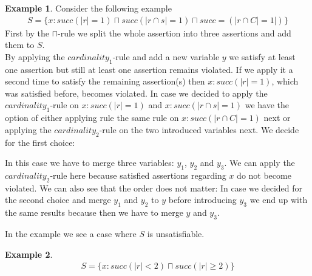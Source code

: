 \documentclass[a4paper,11pt]{scrartcl}
\theoremstyle{break}
\theoremstyle{definition}
\newtheorem{ex}{Example}
\begin{document}
\begin{ex}
Consider the following example 
\begin{align*}
S=\{x:succ(|r|=1)\sqcap succ(|r\cap s|=1)\sqcap succ=(|r\cap C|=1|)\}
\end{align*}
First by the $\sqcap$-rule we split the whole assertion into three assertions and add them to $S$.\\
By applying the $cardinality_1$-rule and add a new variable $y$ we satisfy at least one assertion but still at least one assertion remains violated. If we apply it a second time to satisfy the remaining assertion(s) then $x:succ(|r|=1)$, which was satisfied before, becomes violated. In case we decided to apply the $cardinality_1$-rule on $x:succ(|r|=1)$ and $x:succ(|r\cap s|=1)$ we have the option of either applying rule the same rule on $x:succ(|r\cap C|=1)$ next or applying the $cardinality_2$-rule on the two introduced variables next. We decide for the first choice:
\begin{figure}[H]
\centering
{}
\end{figure}
In this case we have to merge three variables: $y_1$, $y_2$ and $y_3$. We can apply the $cardinality_2$-rule here because satisfied assertions regarding $x$ do not become violated. We can also see that the order does not matter: In case we decided for the second choice and merge $y_1$ and $y_2$ to $y$ before introducing $y_3$ we end up with the same results because then we have to merge $y$ and $y_3$.
\begin{figure}[H]
\centering
{}
\end{figure}
\end{ex}
In the example we see a case where $S$ is unsatisfiable.
\begin{ex}
\begin{align*}
S=\{x:succ(|r|<2)\sqcap succ(|r|\geq 2)\}	
\end{align*}
\end{ex}
\end{document}
